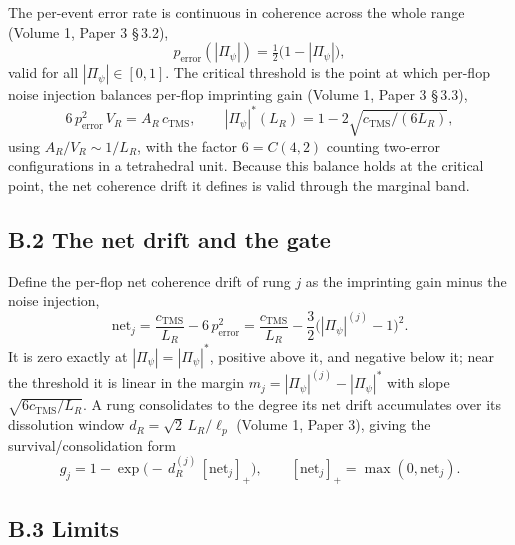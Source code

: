 \documentclass[11pt,oneside]{report}
\theoremstyle{definition}
\theoremstyle{remark}
\begin{document}
The per-event error rate is continuous in coherence across the whole range
(Volume 1, Paper 3 \S\,3.2),
\[
p_{\mathrm{error}}(|\Pi_\psi|) = \tfrac{1}{2}\bigl(1 - |\Pi_\psi|\bigr),
\]
valid for all \ensuremath{|\Pi_\psi| \in [0,1]}. The critical threshold is the
point at which per-flop noise injection balances per-flop imprinting gain
(Volume 1, Paper 3 \S\,3.3),
\[
6\,p_{\mathrm{error}}^{2}\,V_R = A_R\,c_{\mathrm{TMS}},
\qquad
|\Pi_\psi|^{*}(L_R) = 1 - 2\sqrt{c_{\mathrm{TMS}}/(6 L_R)},
\]
using \ensuremath{A_R/V_R \sim 1/L_R}, with the factor \ensuremath{6 = C(4,2)}
counting two-error configurations in a tetrahedral unit. Because this balance
holds at the critical point, the net coherence drift it defines is valid
through the marginal band.

\subsection*{B.2 The net drift and the gate}

Define the per-flop net coherence drift of rung \ensuremath{j} as the imprinting
gain minus the noise injection,
\[
\mathrm{net}_j = \frac{c_{\mathrm{TMS}}}{L_R} - 6\,p_{\mathrm{error}}^{2}
= \frac{c_{\mathrm{TMS}}}{L_R} - \frac{3}{2}\bigl(|\Pi_\psi|^{(j)} - 1\bigr)^{2}.
\]
It is zero exactly at \ensuremath{|\Pi_\psi| = |\Pi_\psi|^{*}}, positive above
it, and negative below it; near the threshold it is linear in the margin
\ensuremath{m_j = |\Pi_\psi|^{(j)} - |\Pi_\psi|^{*}} with slope
\ensuremath{\sqrt{6 c_{\mathrm{TMS}}/L_R}}. A rung consolidates to the degree
its net drift accumulates over its dissolution window
\ensuremath{d_R = \sqrt{2}\,L_R/\ell_p} (Volume 1, Paper 3), giving the
survival/consolidation form
\[
g_j = 1 - \exp\!\bigl(-\,d_R^{(j)}\,[\mathrm{net}_j]_{+}\bigr),
\qquad [\mathrm{net}_j]_{+} = \max(0, \mathrm{net}_j).
\]

\subsection*{B.3 Limits}
\end{document}
